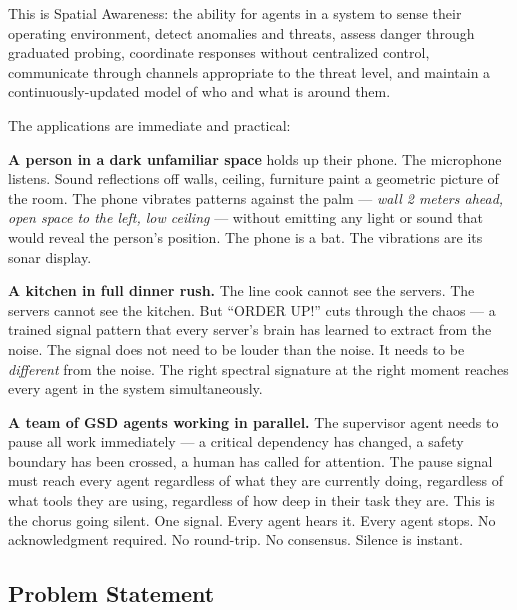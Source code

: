 \documentclass[11pt,letterpaper]{article}
\begin{document}
This is Spatial Awareness: the ability for agents in a system to sense their operating environment, detect anomalies and threats, assess danger through graduated probing, coordinate responses without centralized control, communicate through channels appropriate to the threat level, and maintain a continuously-updated model of who and what is around them.

The applications are immediate and practical:

\textbf{A person in a dark unfamiliar space} holds up their phone. The microphone listens. Sound reflections off walls, ceiling, furniture paint a geometric picture of the room. The phone vibrates patterns against the palm --- \textit{wall 2 meters ahead, open space to the left, low ceiling} --- without emitting any light or sound that would reveal the person's position. The phone is a bat. The vibrations are its sonar display.

\textbf{A kitchen in full dinner rush.} The line cook cannot see the servers. The servers cannot see the kitchen. But ``ORDER UP!'' cuts through the chaos --- a trained signal pattern that every server's brain has learned to extract from the noise. The signal does not need to be louder than the noise. It needs to be \textit{different} from the noise. The right spectral signature at the right moment reaches every agent in the system simultaneously.

\textbf{A team of GSD agents working in parallel.} The supervisor agent needs to pause all work immediately --- a critical dependency has changed, a safety boundary has been crossed, a human has called for attention. The pause signal must reach every agent regardless of what they are currently doing, regardless of what tools they are using, regardless of how deep in their task they are. This is the chorus going silent. One signal. Every agent hears it. Every agent stops. No acknowledgment required. No round-trip. No consensus. Silence is instant.

\subsection{Problem Statement}
\end{document}
